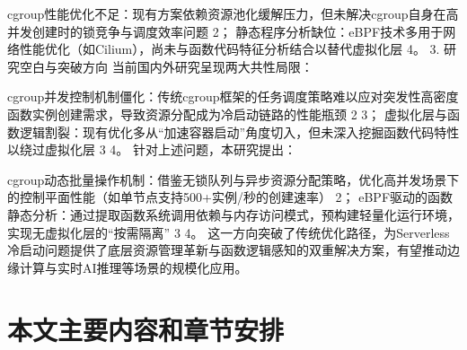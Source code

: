 cgroup性能优化不足：现有方案依赖资源池化缓解压力，但未解决cgroup自身在高并发创建时的锁竞争与调度效率问题 2；
静态程序分析缺位：eBPF技术多用于网络性能优化（如Cilium），尚未与函数代码特征分析结合以替代虚拟化层 4。
3. 研究空白与突破方向
当前国内外研究呈现两大共性局限：

cgroup并发控制机制僵化：传统cgroup框架的任务调度策略难以应对突发性高密度函数实例创建需求，导致资源分配成为冷启动链路的性能瓶颈 2 3；
虚拟化层与函数逻辑割裂：现有优化多从“加速容器启动”角度切入，但未深入挖掘函数代码特性以绕过虚拟化层 3 4。
针对上述问题，本研究提出：

cgroup动态批量操作机制：借鉴无锁队列与异步资源分配策略，优化高并发场景下的控制平面性能（如单节点支持500+实例/秒的创建速率） 2；
eBPF驱动的函数静态分析：通过提取函数系统调用依赖与内存访问模式，预构建轻量化运行环境，实现无虚拟化层的“按需隔离” 3 4。
这一方向突破了传统优化路径，为Serverless冷启动问题提供了底层资源管理革新与函数逻辑感知的双重解决方案，有望推动边缘计算与实时AI推理等场景的规模化应用。


\section{本文主要内容和章节安排}




